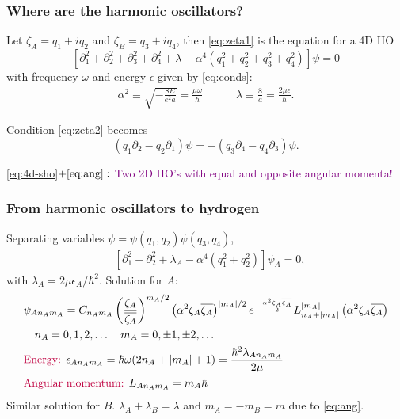 \documentclass{beamer}
\theoremstyle{definition}
\newcommand{\lp}{\left(}
\newcommand{\rp}{\right)}
\newcommand{\p}{\partial}
\newcommand{\f}[2]{\frac{#1}{#2}}
\newcommand{\al}{\alpha}
\begin{document}
\begin{frame}
	\frametitle{Where are the harmonic oscillators?}
	
	Let $\zeta_A = q_1 + iq_2$ and $\zeta_B = q_3 + iq_4$, then \eqref{eq:zeta1} is the equation for a 4D HO
	\begin{equation}\label{eq:4d-sho}
	[\p_1^2 + \p_2^2 + \p_3^2 + \p_4^2 + \lambda - \al^4(q_1^2 + q_2^2 + q_3^2 + q_4^2)] \psi = 0
	\end{equation}
	\pause
	with frequency $\omega$ and energy $\epsilon$ given by \eqref{eq:conds}:
	\begin{align*}
	\al^2 \equiv \sqrt{-\f{8E}{e^2 a}} = \f{\mu \omega}{\hbar} 
	\quad\quad\quad 
	\lambda \equiv \f{8}{a} = \f{2\mu \epsilon}{\hbar}.
	\end{align*}
	
	\pause 
	Condition \eqref{eq:zeta2} becomes
	\begin{equation}
	\label{eq:ang}
	(q_1 \p_2 - q_2 \p_1) \psi = -(q_3 \p_4 - q_4 \p_3)\psi.
	\end{equation}
	
	\eqref{eq:4d-sho}$ + \eqref{eq:ang}:$ 
	\textcolor{purple}{Two 2D HO's with equal and opposite angular momenta!}
\end{frame}




\begin{frame}
	\frametitle{From harmonic oscillators to hydrogen}
	
	Separating variables $\psi = \psi(q_1, q_2) \psi(q_3, q_4)$, 
	\begin{align*}
	&[\p_1^2 + \p_2^2 + \lambda_A - \al^4(q_1^2 + q_2^2)]\psi_A = 0,
	\end{align*}
	with $\lambda_A = 2\mu \epsilon_A / \hbar^2$.  \pause Solution for $A$: 
	\begin{align*}
	&\psi_{A n_A m_A}  = C_{n_Am_A} \lp \f{\zeta_A }{\overline{\zeta_A}} \rp^{{m_A}/2}  
	\lp\al^2 \zeta_A \overline{\zeta_A}\rp^{\abs{m_A}/2}e^{ -\f{\al^2 \zeta_A \overline{\zeta_A}}{2} } 
	L_{n_A + \abs{m_A}}^{\abs{m_A}} \lp \al^2 \zeta_A \overline{\zeta_A} \rp\\
	&\quad n_A = 0,1,2,\dots \quad 
	m_A = 0, \pm 1, \pm 2, \dots  \\ 
	&\text{\textcolor{purple}{Energy: }} \epsilon_{A n_A m_A} = \hbar \omega(2n_A + \abs{m_A} + 1) = \f{\hbar^2 \lambda_{An_A m_A}}{2\mu}\\
	&\text{\textcolor{purple}{Angular momentum: }} L_{A n_A m_A} = m_A \hbar 
	\end{align*}
	Similar solution for $B$. $\lambda_A + \lambda_B = \lambda$ and $m_A = -m_B = m$ due to \eqref{eq:ang}.
\end{frame}
\end{document}
